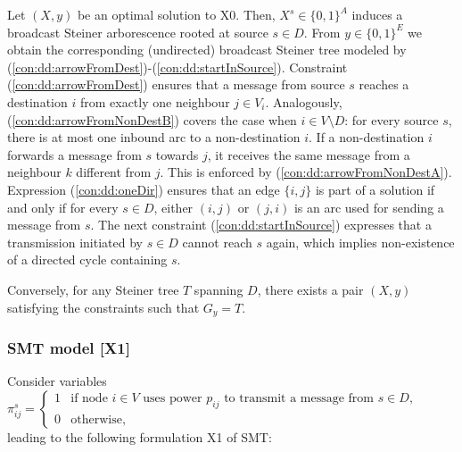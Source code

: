 Let $(X,y)$ be an optimal solution to X0.
Then, $X^s\in \{0,1\}^{A}$ induces a broadcast Steiner arborescence rooted at source $s\in D$.
From $y\in \{0,1\}^E$ we obtain the corresponding (undirected) broadcast Steiner tree modeled by (\ref{con:dd:arrowFromDest})-(\ref{con:dd:startInSource}).
Constraint (\ref{con:dd:arrowFromDest}) ensures that a message from source $s$ reaches a destination $i$ from exactly one neighbour $j\in V_i$.
Analogously, (\ref{con:dd:arrowFromNonDestB}) covers the case when $i \in V\setminus D$: for every source $s$, there is at most one inbound arc to a non-destination $i$.
If a non-destination $i$ forwards a message from $s$ towards $j$, it receives the same message from a neighbour $k$ different from $j$.
This is enforced by (\ref{con:dd:arrowFromNonDestA}).
Expression (\ref{con:dd:oneDir}) ensures that an edge $\{i,j\}$ is part of a solution if and only if for every $s\in D$, either $(i,j)$ or $(j,i)$ is an arc used for sending a message from $s$.
The next constraint (\ref{con:dd:startInSource}) expresses that a transmission initiated by $s\in D$ cannot reach $s$ again, which implies non-existence of a directed cycle containing $s$.

Conversely, for any Steiner tree $T$ spanning $D$, there exists a pair $(X,y)$ satisfying the constraints such that $G_y=T$. 

\subsubsection{SMT model [X1]}

Consider variables
\newline\newline
$\pi^s_{ij}=
\begin{cases}
    1 & \text{if node $i \in V$ uses power $p_{ij}$ to transmit a message from $s\in D$},\\
    0 & \text{otherwise},
  \end{cases}$
\newline\newline
leading to the following formulation X1 of SMT:

